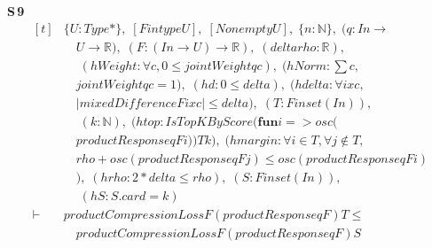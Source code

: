 \noindent\textbf{S\,9}\quad{}
{\footnotesize\[ \begin{aligned}[t]
&\{ \mathit{U} : \mathit{Type}*\},\; [\mathit{Fintype} \mathit{U}],\; [\mathit{Nonempty} \mathit{U}],\; \{ \mathit{n} : \mathbb{N} \},\; (\mathit{q} : \mathit{I} \mathit{n} \to\\
&\quad \mathit{U} \to \mathbb{R} ),\; (\mathit{F} : (\mathit{I} \mathit{n} \to \mathit{U}) \to \mathbb{R} ),\; (\mathit{delta} \mathit{rho} : \mathbb{R} ),\\
&\quad \; (\mathit{hWeight} : \forall \mathit{c},0 \leq \mathit{jointWeight} \mathit{q} \mathit{c}),\; (\mathit{hNorm} : \textstyle\sum \mathit{c},\\
&\quad \mathit{jointWeight} \mathit{q} \mathit{c}=1),\; (\mathit{hd} : 0 \leq \mathit{delta}),\; (\mathit{hdelta} : \forall \mathit{i} \mathit{x} \mathit{c},\\
&\quad |\mathit{mixedDifference} \mathit{F} \mathit{i} \mathit{x} \mathit{c}| \leq \mathit{delta}),\; (\mathit{T} : \mathit{Finset} (\mathit{I} \mathit{n})),\\
&\quad \; (\mathit{k} : \mathbb{N} ),\; (\mathit{htop} : \mathit{IsTopKByScore} (\mathbf{fun} \mathit{i} => \mathit{osc} (\\
&\quad \mathit{productResponse} \mathit{q} \mathit{F} \mathit{i})) \mathit{T} \mathit{k}),\; (\mathit{hmargin} : \forall \mathit{i} \in \mathit{T},\forall \mathit{j} \notin \mathit{T},\\
&\quad \mathit{rho}+\mathit{osc} (\mathit{productResponse} \mathit{q} \mathit{F} \mathit{j}) \leq \mathit{osc} (\mathit{productResponse} \mathit{q} \mathit{F} \mathit{i})\\
&\quad ),\; (\mathit{hrho} : 2*\mathit{delta} \leq \mathit{rho}),\; (\mathit{S} : \mathit{Finset} (\mathit{I} \mathit{n})),\\
&\quad \; (\mathit{hS} : \mathit{S}.\mathit{card}=\mathit{k})\\
\vdash\;&\mathit{productCompressionLoss} \mathit{F} (\mathit{productResponse} \mathit{q} \mathit{F}) \mathit{T} \leq\\
&\quad \mathit{productCompressionLoss} \mathit{F} (\mathit{productResponse} \mathit{q} \mathit{F}) \mathit{S}
\end{aligned} \]}

